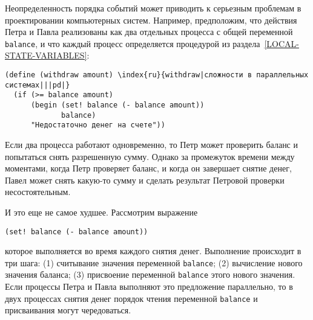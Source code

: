 %
%
Неопределенность порядка событий может приводить к
серьезным проблемам в проектировании компьютерных систем.  Например,
предположим, что действия Петра и Павла реализованы как два отдельных
процесса с общей переменной {\tt ba\-lance}, и что каждый процесс
определяется процедурой из
раздела~\ref{LOCAL-STATE-VARIABLES}:




\begin{Verbatim}[fontsize=\small]
(define (withdraw amount) \index{ru}{withdraw|сложности в параллельных системах|||pd|}
  (if (>= balance amount)
      (begin (set! balance (- balance amount))
             balance)
      "Недостаточно денег на счете"))
\end{Verbatim}
Если два процесса работают одновременно, то Петр может проверить
баланс и попытаться снять разрешенную сумму.  Однако за промежуток
времени между моментами, когда Петр проверяет баланс, и когда он
завершает снятие денег, Павел может снять какую-то сумму и сделать
результат Петровой проверки несостоятельным.

И это еще не самое худшее.  Рассмотрим выражение
\begin{Verbatim}
(set! balance (- balance amount))
\end{Verbatim}
которое выполняется во время каждого снятия денег.  Выполнение
происходит в три шага: (1) считывание значения переменной
{\tt balance}; (2) вычисление нового значения баланса; (3)
присвоение переменной {\tt balance} этого нового значения.  Если
процессы Петра и Павла выполняют это предложение параллельно, то в двух
процессах снятия денег порядок чтения переменной {\tt balance} и
присваивания могут чередоваться.

